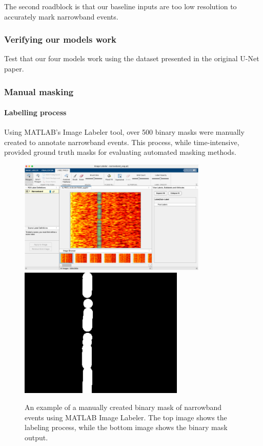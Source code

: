 The second roadblock is that our baseline inputs are too low resolution to accurately mark narrowband events.

\subsubsection{Verifying our models work}

Test that our four models work using the dataset presented in the original U-Net paper.

\subsubsection{Manual masking}

\paragraph{Labelling process}

Using MATLAB's Image Labeler tool, over 500 binary masks were manually created to annotate narrowband events. This process, while time-intensive, provided ground truth masks for evaluating automated masking methods.

\begin{figure}[htbp]
    \centering
    \includegraphics[width=0.8\textwidth]{img/ch4/denoise/matlab_image_labeller.png}
    \includegraphics[width=0.7\textwidth]{img/ch4/denoise/binary_mask_ex.png}
    \caption{An example of a manually created binary mask of narrowband events using MATLAB Image Labeler. The top image shows the labeling process, while the bottom image shows the binary mask output.}
    \label{fig:manual-masks}
\end{figure}

